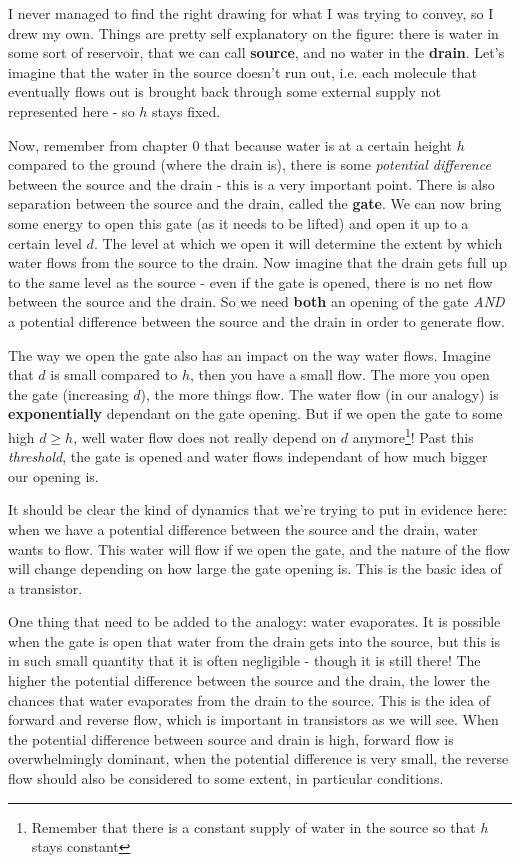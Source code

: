 I never managed to find the right drawing for what I was trying to convey, so I drew my own.
Things are pretty self explanatory on the figure: there is water in some sort of reservoir, that we can call \textbf{source}, and no water in the \textbf{drain}. Let's imagine that the water in the source doesn't run out, i.e. each molecule that eventually flows out is brought back through some external supply not represented here - so $h$ stays fixed.

Now, remember from chapter 0 that because water is at a certain height $h$ compared to the ground (where the drain is), there is some \textit{potential difference} between the source and the drain - this is a very important point. There is also separation between the source and the drain, called the \textbf{gate}. We can now bring some energy to open this gate (as it needs to be lifted) and open it up to a certain level $d$. The level at which we open it will determine the extent by which water flows from the source to the drain. Now imagine that the drain gets full up to the same level as the source - even if the gate is opened, there is no net flow between the source and the drain. So we need \textbf{both} an opening of the gate \textit{AND} a potential difference between the source and the drain in order to generate flow. 

The way we open the gate also has an impact on the way water flows. Imagine that $d$ is small compared to $h$, then you have a small flow. The more you open the gate (increasing $d$), the more things flow. The water flow (in our analogy) is \textbf{exponentially} dependant on the gate opening. But if we open the gate to some high $d \geq h$, well water flow does not really depend on $d$ anymore\footnote{Remember that there is a constant supply of water in the source so that $h$ stays constant}! Past this \textit{threshold}, the gate is opened and water flows independant of how much bigger our opening is.

It should be clear the kind of dynamics that we're trying to put in evidence here: when we have a potential difference between the source and the drain, water wants to flow. This water will flow if we open the gate, and the nature of the flow will change depending on how large the gate opening is. This is the basic idea of a transistor.

One thing that need to be added to the analogy: water evaporates. It is possible when the gate is open that water from the drain gets into the source, but this is in such small quantity that it is often negligible - though it is still there! The higher the potential difference between the source and the drain, the lower the chances that water evaporates from the drain to the source. This is the idea of forward and reverse flow, which is important in transistors as we will see. When the potential difference between source and drain is high, forward flow is overwhelmingly dominant, when the potential difference is very small, the reverse flow should also be considered to some extent, in particular conditions.  


